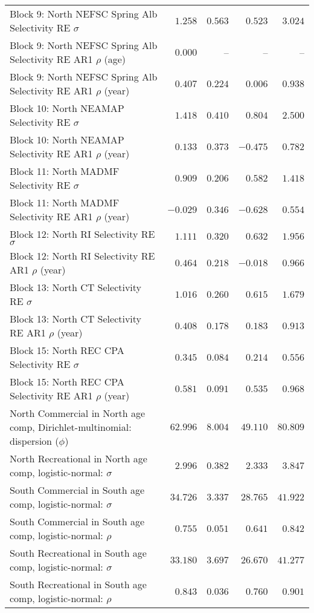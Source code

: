 \documentclass[
]{article}
\begin{document}
\begin{landscape}
\begin{longtable}[t]{lrrrr}
\addlinespace
Block 9: North NEFSC Spring Alb Selectivity RE $\sigma$ & $1.258$ & $0.563$ & $0.523$ & $3.024$\\
Block 9: North NEFSC Spring Alb Selectivity RE AR1 $\rho$ (age) & $0.000$ & -- & -- & --\\
Block 9: North NEFSC Spring Alb Selectivity RE AR1 $\rho$ (year) & $0.407$ & $0.224$ & $0.006$ & $0.938$\\
Block 10: North NEAMAP Selectivity RE $\sigma$ & $1.418$ & $0.410$ & $0.804$ & $2.500$\\
Block 10: North NEAMAP Selectivity RE AR1 $\rho$ (year) & $0.133$ & $0.373$ & $-0.475$ & $0.782$\\
\addlinespace
Block 11: North MADMF Selectivity RE $\sigma$ & $0.909$ & $0.206$ & $0.582$ & $1.418$\\
Block 11: North MADMF Selectivity RE AR1 $\rho$ (year) & $-0.029$ & $0.346$ & $-0.628$ & $0.554$\\
Block 12: North RI Selectivity RE $\sigma$ & $1.111$ & $0.320$ & $0.632$ & $1.956$\\
Block 12: North RI Selectivity RE AR1 $\rho$ (year) & $0.464$ & $0.218$ & $-0.018$ & $0.966$\\
Block 13: North CT Selectivity RE $\sigma$ & $1.016$ & $0.260$ & $0.615$ & $1.679$\\
\addlinespace
Block 13: North CT Selectivity RE AR1 $\rho$ (year) & $0.408$ & $0.178$ & $0.183$ & $0.913$\\
Block 15: North REC CPA Selectivity RE $\sigma$ & $0.345$ & $0.084$ & $0.214$ & $0.556$\\
Block 15: North REC CPA Selectivity RE AR1 $\rho$ (year) & $0.581$ & $0.091$ & $0.535$ & $0.968$\\
North Commercial in North age comp, Dirichlet-multinomial: dispersion ($\phi$) & $62.996$ & $8.004$ & $49.110$ & $80.809$\\
North Recreational in North age comp, logistic-normal: $\sigma$ & $2.996$ & $0.382$ & $2.333$ & $3.847$\\
\addlinespace
South Commercial in South age comp, logistic-normal: $\sigma$ & $34.726$ & $3.337$ & $28.765$ & $41.922$\\
South Commercial in South age comp, logistic-normal: $\rho$ & $0.755$ & $0.051$ & $0.641$ & $0.842$\\
South Recreational in South age comp, logistic-normal: $\sigma$ & $33.180$ & $3.697$ & $26.670$ & $41.277$\\
South Recreational in South age comp, logistic-normal: $\rho$ & $0.843$ & $0.036$ & $0.760$ & $0.901$\\

\end{longtable}
\end{landscape}
\end{document}
